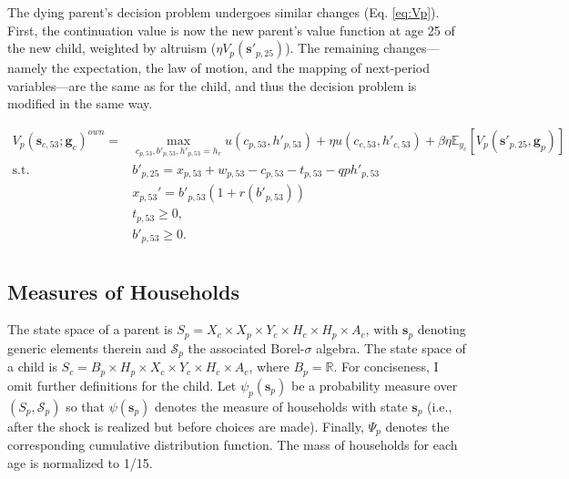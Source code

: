 \documentclass[12pt]{article}
\newcommand{\E}{\mathbb{E}}
\newcommand{\mc}{\mathcal}
\begin{document}
The dying parent's decision problem undergoes similar changes (Eq. \ref{eq:Vp}). First, the continuation value is now the new parent's value function at age 25 of the new child, weighted by altruism ($\eta V_p(\mathbf{s}'_{p,25})$). The remaining changes---namely the expectation, the law of motion, and the mapping of next-period variables---are the same as for the child, and thus the decision problem is modified in the same way.

\begin{equation*}
	\begin{split}
	V_p(\mathbf{s}_{c,53};\mathbf{g}_c)^{own} = &\max_{c_{p,53},b'_{p,53},h'_{p,53}=h_r} u(c_{p,53},h'_{p,53}) + \eta u(c_{c,53},h'_{c,53}) + \beta \eta \E_{y_c}\left[V_{p}({\mathbf{s}'_{p,25}},\mathbf{g}_p) \right] \\
	\text{s.t.}\quad & b'_{p,25} = x_{p,53} + w_{p,53} - c_{p,53} - t_{p,53} - q p h'_{p,53}\\
	& x_{p,53}' = b'_{p,53}(1+r(b'_{p,53})) \\
	& t_{p,53}\ge 0, \\
	& b'_{p,53}\ge 0. \\
	\end{split}
\end{equation*} 


\subsection{Measures of Households}\label{sec:hhmeasures}
The state space of a parent is $S_p = X_c \times X_p \times Y_c \times H_c \times H_p \times A_c$, with $\mathbf{s}_p$ denoting generic elements therein and $\mc{S}_p$ the associated Borel-$\sigma$ algebra. The state space of a child is $S_c= B_p \times H_p \times X_c \times Y_c \times H_c \times A_c$, where $B_p=\mathbb{R}$. For conciseness, I omit further definitions for the child. Let $\psi_p(\mathbf s_p)$ be a probability measure over $(S_p,\mc{S}_p)$ so that $\psi(\mathbf s_p)$ denotes the measure of households with state $\mathbf s_p$ (i.e., after the shock is realized but before choices are made). Finally, $\Psi_p$ denotes the corresponding cumulative distribution function. The mass of households for each age is normalized to 1/15.
\end{document}
